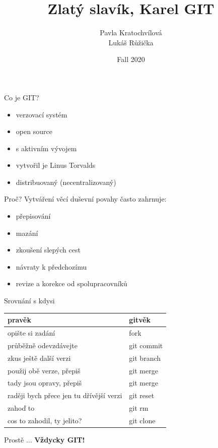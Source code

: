 \documentclass[14pt]{beamer}
\begin{document}
	\author{Pavla Kratochvílová \\ Lukáš Růžička}
	\title{Zlatý slavík, Karel GIT}
	\date{Fall 2020}
	\begin{frame}[plain]
		\maketitle
	\end{frame}


	\begin{frame}{Co je GIT?}
	\begin{itemize}
		\item verzovací systém
		\item open source
		\item s aktivním vývojem
		\item vytvořil je Linus Torvalds
		\item distribuovaný (necentralizovaný)
	\end{itemize}
	\end{frame}


	\begin{frame}{Proč?}
	 Vytváření věcí duševní povahy často zahrnuje:
		\vspace{5pt}
		
	\begin{itemize}
		\item přepisování
		\item mazání
		\item zkoušení slepých cest
		\item návraty k předchozímu
		\item revize a korekce od spolupracovníků
	\end{itemize}
\end{frame}
		
\begin{frame}{Srovnání s kdysi}
	
	\begin{tabular}{l|l}
		\textbf{pravěk} & \textbf{gitvěk} \\
		\hline opište si zadání &  fork \\
		průběžně odevzdávejte & git commit \\
		zkus ještě další verzi & git branch \\
		použij obě verze, přepiš  & git merge \\
		tady jsou opravy, přepiš & git merge \\
		raději bych přece jen tu dřívější verzi & git reset \\
		zahoď to & git rm \\
        cos to zahodil, ty jelito? & git clone
	\end{tabular}
	
	\vspace{10pt}
		
	Prostě $\ldots${} \textbf{Vždycky GIT!}

\end{frame}
\end{document}
